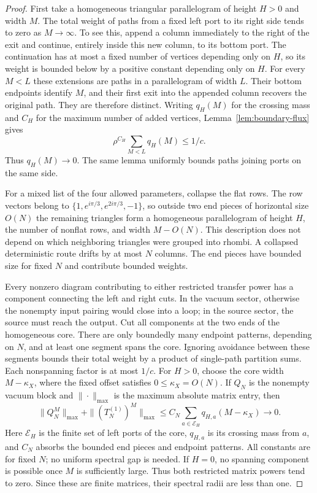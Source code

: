 \begin{proof}
First take a homogeneous triangular parallelogram of height $H>0$
and width $M$. The total weight of paths from a fixed left port to
its right side tends to zero as $M\to\infty$. To see this, append a
column immediately to the right of the exit and continue, entirely
inside this new column, to its bottom port. The continuation has at most a fixed number
of vertices depending only on $H$, so its weight is bounded below
by a positive constant depending only on $H$. For every $M<L$ these
extensions are paths in a parallelogram of width $L$. Their bottom
endpoints identify $M$, and their first exit into the appended
column recovers the original path. They are therefore distinct.
Writing $q_H(M)$ for the crossing mass and $C_H$ for the maximum
number of added vertices, Lemma~\ref{lem:boundary-flux} gives
\[
 \rho^{C_H}\sum_{M<L}q_H(M)\le 1/c.
\]
Thus $q_H(M)\to0$. The same lemma uniformly bounds paths joining
ports on the same side.

For a mixed list of the four allowed parameters, collapse the flat
rows. The row vectors belong to
$\{1,e^{i\pi/3},e^{2i\pi/3},-1\}$, so outside two end pieces of
horizontal size $O(N)$ the remaining triangles form a homogeneous
parallelogram of height $H$, the number of nonflat rows, and width
$M-O(N)$. This description does not depend on which neighboring
triangles were grouped into rhombi. A collapsed deterministic route
drifts by at most $N$ columns. The end pieces have bounded size for
fixed $N$ and contribute bounded weights.

Every nonzero diagram contributing to either restricted transfer
power has a component connecting the left and right cuts. In the
vacuum sector, otherwise the nonempty input pairing would close
into a loop; in the source sector, the source must reach the output.
Cut all components at the two ends of the homogeneous core. There
are only boundedly many endpoint patterns, depending on $N$, and at
least one segment spans the core. Ignoring avoidance between these
segments bounds their total weight by a product of single-path
partition sums. Each nonspanning factor is at most $1/c$.
For $H>0$, choose the core width $M-\kappa_X$, where the fixed
offset satisfies $0\le\kappa_X=O(N)$. If $Q_N$ is the nonempty vacuum block and
$\|\cdot\|_{\max}$ is the maximum absolute matrix entry, then
\[
 \|Q_N^M\|_{\max}+\|(T_N^{(1)})^M\|_{\max}
 \le C_N\sum_{a\in\mathcal E_H}q_{H,a}(M-\kappa_X)\longrightarrow0.
\]
Here $\mathcal E_H$ is the finite set of left ports of the core,
$q_{H,a}$ is its crossing mass from $a$, and $C_N$ absorbs the bounded
end pieces and endpoint patterns. All constants are for fixed $N$;
no uniform spectral gap is needed. If $H=0$,
no spanning component is possible once $M$ is sufficiently large.
Thus both restricted matrix powers tend to zero. Since these are
finite matrices, their spectral radii are less than one.


\end{proof}
